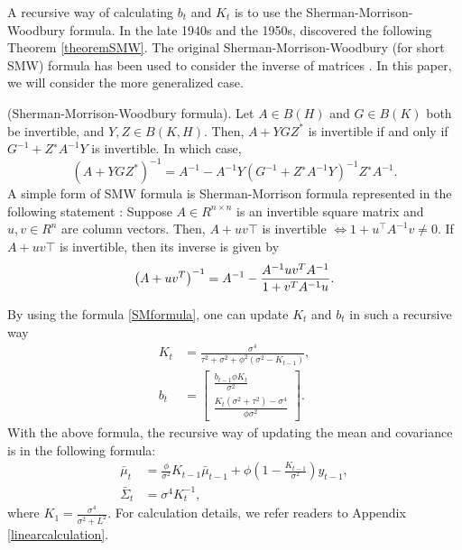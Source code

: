A recursive way of calculating $b_t$ and $K_t$ is to use the Sherman-Morrison-Woodbury formula. In the late 1940s and the 1950s,
\cite{sherman1950adjustment, woodbury1950inverting, bartlett1951inverse, bodewig1956matrix} 
discovered the following Theorem \ref{theoremSMW}. The original Sherman-Morrison-Woodbury (for short SMW) formula has been used to consider the inverse of matrices \citep{deng2011generalization}. In this paper, we will consider the more generalized case. 
\begin{theorem}\label{theoremSMW}
(Sherman-Morrison-Woodbury formula). Let $A \in B(H)$ and $G \in B(K)$ both be invertible, and $Y, Z \in B(K, H)$. Then, $A + YGZ^*$ is invertible if and only if $G^{-1} + Z^∗A^{-1}Y$ is invertible. In which case,
\begin{equation}\label{SMWformula}
\left(A+YGZ^*\right)^{-1}= A^{-1}-A^{-1}Y\left(G^{-1}+Z^∗A^{-1}Y\right)^{-1}Z^∗A^{-1}.
\end{equation}
A simple form of SMW formula is Sherman-Morrison formula represented in the following statement \citep{bartlett1951inverse}:
Suppose $A\in R^{n\times n}$ is an invertible square matrix and $u,v\in R^n$ are column vectors. Then, $A+uv\top$ is invertible $\iff 1+u^\top A^{-1}v\neq 0$. If $A+uv\top$ is invertible, then its inverse is given by
\begin{equation}\label{SMformula}
\left(A+uv^{T}\right)^{-1}=A^{-1}-{A^{-1}uv^{T}A^{-1} \over 1+v^{T}A^{-1}u}.
\end{equation}
\end{theorem}

By using the formula \eqref{SMformula}, one can update $K_{t}$ and $b_{t}$  in such a recursive way
\begin{align}\label{linearOUKreg}
K_{t}  &=\frac{\sigma^4}{\tau^2+\sigma^2+\phi^2(\sigma^2-K_{t-1})},\\
b_{t} &= \begin{bmatrix}
\frac{b_{t-1}\phi K_{t}}{\sigma^2} \\ \label{linearOUbreg} \frac{K_{t}(\sigma^2+\tau^2)-\sigma^4 }{\phi\sigma^2}
\end{bmatrix}. 
\end{align}
With the above formula, the recursive way of updating the mean and covariance is in the following formula: 
\begin{align}
\bar{\mu}_{t}       & = \frac{\phi}{\sigma^2}K_{t-1}\bar{\mu}_{t-1} + \phi \left(1 - \frac{K_{t-1}}{\sigma^2}\right)y_{t-1}, \\
\bar{\Sigma}_{t}  &= \sigma^4K_{t}^{-1},
\end{align}
where $K_1=\frac{\sigma^4}{\sigma^2+L^2}$. 
For calculation details, we refer readers to Appendix \ref{linearcalculation}.


